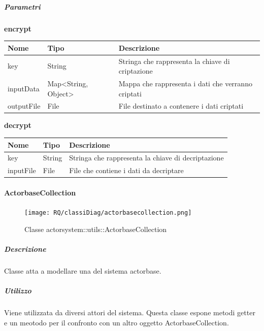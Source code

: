 \documentclass{scalatekids-article}
\begin{document}
\subparagraph{Parametri}
\begin{center}
  \textbf{encrypt}\\
\end{center}
\begin{tabular}{| l | l | l |}
  \hline
  Nome & Tipo & Descrizione\\
  \hline
  key & String & Stringa che rappresenta la chiave di criptazione \\
  \hline
  inputData & Map<String, Object> & Mappa che rappresenta i dati che verranno criptati \\
  \hline
  outputFile & File & File destinato a contenere i dati criptati \\
  \hline
\end{tabular}

\begin{center}
  \textbf{decrypt}\\
\end{center}
\begin{tabular}{| l | l | l |}
  \hline
  Nome & Tipo & Descrizione\\
  \hline
  key & String & Stringa che rappresenta la chiave di decriptazione \\
  \hline
  inputFile & File & File che contiene i dati da decriptare \\
  \hline
\end{tabular}


\paragraph{ActorbaseCollection}
\label{sec:actorbase::actorsystem::utils::ActorbaseCollection}

\begin{figure}[H]
  \begin{center}
    \texttt{[image: RQ/classiDiag/actorbasecollection.png]}
    \caption{Classe actorsystem::utils::ActorbaseCollection}
  \end{center}
\end{figure}

\subparagraph{Descrizione}
Classe atta a modellare una  del sistema actorbase.

\subparagraph{Utilizzo}
Viene utilizzata da diversi attori del sistema. Questa classe espone metodi
getter e un meotodo per il confronto con un altro oggetto ActorbaseCollection.
\end{document}
